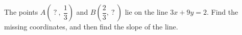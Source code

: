 The points $A\left(\ ?\ ,\ \dfrac{1}{3}\right)$ and $B\left(\dfrac{2}{3},\ ?\ \right)$ lie on the line $3x+9y=2$. Find the missing coordinates, and then find the slope of the line.

